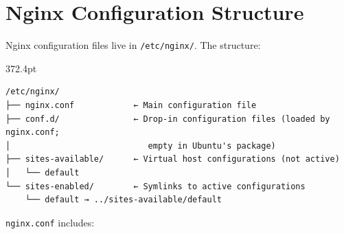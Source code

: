 \begin{codebox}[short]

\begin{Shaded}
\begin{Highlighting}[]

 

\end{Highlighting}
\end{Shaded}

\end{codebox}

\setcounter{section}{2}
\section{Nginx Configuration Structure}\label{28-traffic-routing:283-nginx-configuration-structure}

Nginx configuration files live in \texttt{/etc/nginx/}. The structure:

\begin{diagrambox}[short]{372.4pt}
\begin{Verbatim}[fontsize=\fontsize{9.0}{8.55}\selectfont]
/etc/nginx/
├── nginx.conf            ← Main configuration file
├── conf.d/               ← Drop-in configuration files (loaded by nginx.conf;
│                            empty in Ubuntu's package)
├── sites-available/      ← Virtual host configurations (not active)
│   └── default
└── sites-enabled/        ← Symlinks to active configurations
    └── default → ../sites-available/default
\end{Verbatim}
\end{diagrambox}

\noindent{}\texttt{nginx.conf} includes:

\begin{codebox}[short]

\begin{Shaded}
\begin{Highlighting}[]
\end{Highlighting}
\end{Shaded}

\end{codebox}


